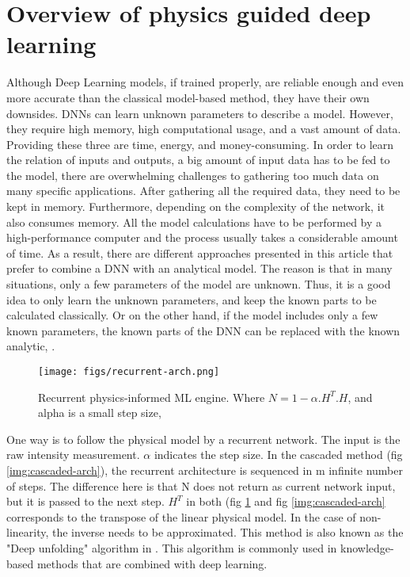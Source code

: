 \documentclass[conference, 11pt]{IEEEtran}
\begin{document}
	\section{Overview of physics guided deep learning}
	Although Deep Learning models, if trained properly, are reliable enough and even more accurate than the classical model-based method, they have their own downsides. DNNs can learn unknown parameters to describe a model. However, they require high memory, high computational usage, and a vast amount of data. Providing these three are time, energy, and money-consuming. In order to learn the relation of inputs and outputs, a big amount of input data has to be fed to the model, there are overwhelming challenges to gathering too much data on many specific applications. After gathering all the required data, they need to be kept in memory. Furthermore, depending on the complexity of the network, it also consumes memory. All the model calculations have to be performed by a high-performance computer and the process usually takes a considerable amount of time. As a result, there are different approaches presented in this article that prefer to combine a DNN with an analytical model. The reason is that in many situations, only a few parameters of the model are unknown. Thus, it is a good idea to only learn the unknown parameters, and keep the known parts to be calculated classically. Or on the other hand, if the model includes only a few known parameters, the known parts of the DNN can be replaced with the known analytic, \cite{Shlezinger2021}.
	
		
	\begin{figure}[!htbp]
		\texttt{[image: figs/recurrent-arch.png]}
		\centering
		\caption{Recurrent physics-informed ML engine. Where \(N = 1 - \alpha.H^T.H\), and alpha is a small step size, \cite{Ozcan2019}}
		\label{img:recurrent-arch}
	\end{figure}
	\pagebreak
	
	One way is to follow the physical model by a recurrent network. The input is the raw intensity measurement. $\alpha$ indicates the step size. In the cascaded method (fig \ref{img:cascaded-arch}), the recurrent architecture is sequenced in m infinite number of steps. The difference here is that N does not return as current network input, but it is passed to the next step. \(H^{T}\) in both (fig \ref{img:recurrent-arch} and fig \ref{img:cascaded-arch} corresponds to the transpose of the linear physical model. In the case of non-linearity, the inverse needs to be approximated. This method is also known as the "Deep unfolding" algorithm in \cite{Shlezinger2021}.	This algorithm is commonly used in knowledge-based methods that are combined with deep learning.
\end{document}
